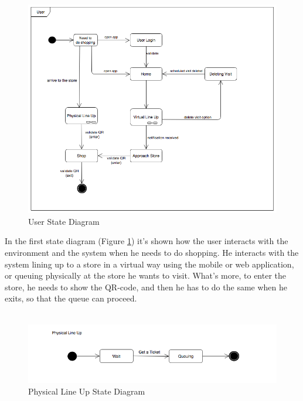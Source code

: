 \documentclass[]{article}
\begin{document}
		\begin{figure}[H]
			\centering
			\includegraphics[scale=0.5]{User_statediagram.png}
			\caption{User State Diagram}
			\label{fig:state_diagram1}
		\end{figure}
		
		
		In the first state diagram (Figure \ref{fig:state_diagram1}) it’s shown how the user interacts with the environment and the system when he needs to do shopping. He interacts with the system lining up to a store in a virtual way using the mobile or web application, or queuing physically at the store he wants to visit.
What’s more, to enter the store, he needs to show the QR-code, and then he has to do the same when he exits, so that the queue can proceed. \\

		\textbf{}\\ \newpage

		\begin{figure}[H]
			\centering
			\includegraphics[width=\linewidth]{PhysicalLineUp_statediagram.png}
			\caption{Physical Line Up State Diagram}
			\label{fig:state_diagram2}
		\end{figure}
		
\end{document}
